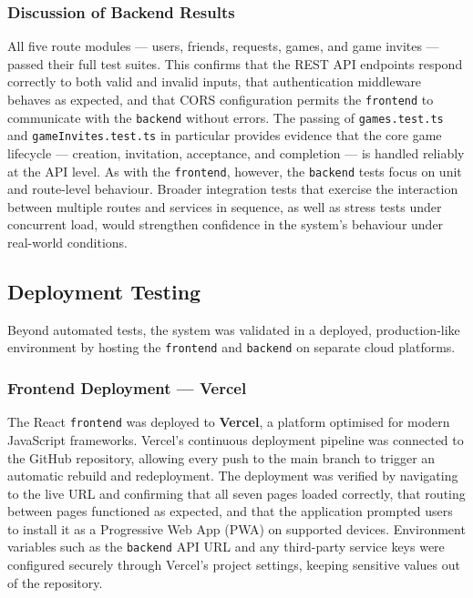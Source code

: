 \subsubsection*{Discussion of Backend Results}

All five route modules — users, friends, requests, games, and game invites — passed their full test suites. This confirms that the REST API endpoints respond correctly to both valid and invalid inputs, that authentication middleware behaves as expected, and that CORS configuration permits the \texttt{frontend} to communicate with the \texttt{backend} without errors. The passing of \texttt{games.test.ts} and \texttt{gameInvites.test.ts} in particular provides evidence that the core game lifecycle — creation, invitation, acceptance, and completion — is handled reliably at the API level. As with the \texttt{frontend}, however, the \texttt{backend} tests focus on unit and route-level behaviour. Broader integration tests that exercise the interaction between multiple routes and services in sequence, as well as stress tests under concurrent load, would strengthen confidence in the system's behaviour under real-world conditions.

\subsection*{Deployment Testing}

Beyond automated tests, the system was validated in a deployed, production-like environment by hosting the \texttt{frontend} and \texttt{backend} on separate cloud platforms.

\subsubsection*{Frontend Deployment — Vercel}

The React \texttt{frontend} was deployed to \textbf{Vercel}, a platform optimised for modern JavaScript frameworks. Vercel's continuous deployment pipeline was connected to the GitHub repository, allowing every push to the main branch to trigger an automatic rebuild and redeployment. The deployment was verified by navigating to the live URL and confirming that all seven pages loaded correctly, that routing between pages functioned as expected, and that the application prompted users to install it as a Progressive Web App (PWA) on supported devices. Environment variables such as the \texttt{backend} API URL and any third-party service keys were configured securely through Vercel's project settings, keeping sensitive values out of the repository.

